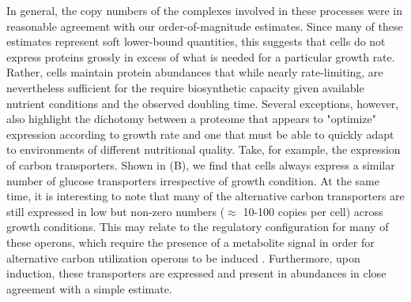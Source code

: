 In general, the copy numbers of the complexes involved in these processes were
in reasonable agreement with our order-of-magnitude estimates. Since many of
these estimates represent soft lower-bound quantities, this suggests that cells
do not express proteins grossly in excess of what is needed for a particular
growth rate. Rather, cells maintain protein abundances that while nearly
rate-limiting, are nevertheless sufficient for the require biosynthetic
capacity given available nutrient conditions and the observed doubling time.
Several exceptions, however, also highlight the dichotomy between a proteome
that appears to "optimize" expression according to growth rate and one that must
be able to quickly adapt to environments of different nutritional quality. Take,
for example, the expression of carbon transporters. Shown in
(B), we find that cells always express a similar number of
glucose transporters irrespective of growth condition. At the same time, it is
interesting to note that many of the alternative carbon transporters are still
expressed in low but non-zero numbers ($\approx$ 10-100 copies per cell) across
growth conditions. This may relate to the regulatory configuration for many of
these operons, which require the presence of a metabolite signal in order for
alternative carbon utilization operons to be induced \citep{monod1949,
laxhuber2020}. Furthermore, upon induction, these transporters are expressed and
present in abundances in close agreement with a simple estimate.

